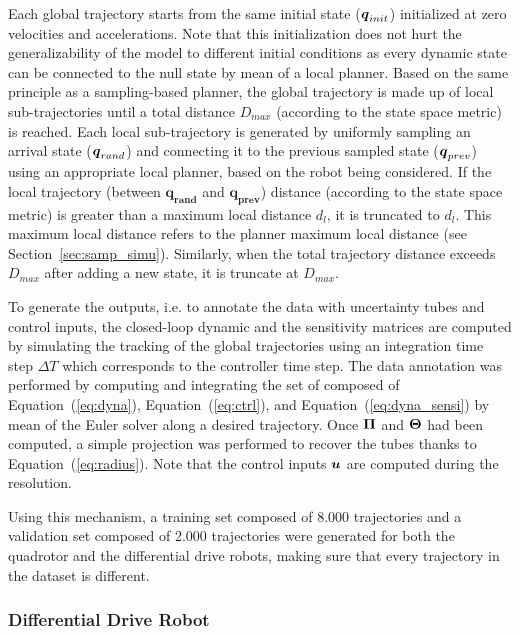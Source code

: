 Each global trajectory starts from the same initial state ($\boldsymbol{q}_{init}$) initialized at zero velocities and accelerations.
Note that this initialization does not hurt the generalizability of the model to different initial conditions as every dynamic state can be connected to the null state by mean of a local planner.
Based on the same principle as a sampling-based planner, the global trajectory is made up of local sub-trajectories until a total distance $D_{max}$ (according to the state space metric) is reached.
Each local sub-trajectory is generated by uniformly sampling an arrival state ($\boldsymbol{q}_{rand}$) and connecting it to the previous sampled state ($\boldsymbol{q}_{prev}$) using an appropriate local planner, based on the robot being considered.
If the local trajectory (between $\boldsymbol{q_{rand}}$ and $\boldsymbol{q_{prev}}$) distance (according to the state space metric) is greater than a maximum local distance $d_l$, it is truncated to $d_l$. 
This maximum local distance refers to the planner maximum local distance (see Section~\ref{sec:samp_simu}).
Similarly, when the total trajectory distance exceeds $D_{max}$ after adding a new state, it is truncate at $D_{max}$.

To generate the outputs, i.e. to annotate the data with uncertainty tubes and control inputs, the closed-loop dynamic and the sensitivity matrices are computed by simulating the tracking of the global trajectories using an integration time step $\Delta T$ which corresponds to the controller time step.
The data annotation was performed by computing and integrating the set of  composed of Equation~(\ref{eq:dyna}), Equation~(\ref{eq:ctrl}), and Equation~(\ref{eq:dyna_sensi}) by mean of the Euler  solver along a desired trajectory. 
Once $\boldsymbol{\Pi}$ and $\boldsymbol{\Theta}$ had been computed, a simple projection was performed to recover the tubes thanks to Equation~(\ref{eq:radius}).
Note that the control inputs $\boldsymbol{u}$ are computed during the  resolution.

Using this mechanism, a training set composed of 8.000 trajectories and a validation set composed of 2.000 trajectories were generated for both the quadrotor and the differential drive robots, making sure that every trajectory in the dataset is different.

\subsubsection{Differential Drive Robot}\label{sec:dataset_unic}

